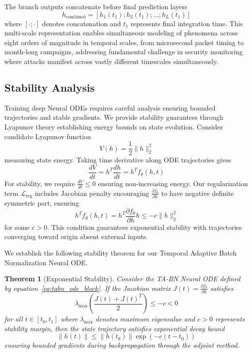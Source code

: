 \documentclass[10pt,journal,compsoc]{IEEEtran}
\newtheorem{theorem}{Theorem}
\begin{document}
The branch outputs concatenate before final prediction layers
\begin{equation}
h_{\text{combined}} = [h_1(t_1); h_2(t_1); \ldots; h_L(t_1)]
\end{equation}
where $[\cdot; \cdot]$ denotes concatenation and $t_1$ represents final integration time. This multi-scale representation enables simultaneous modeling of phenomena across eight orders of magnitude in temporal scales, from microsecond packet timing to month-long campaigns, addressing fundamental challenge in security monitoring where attacks manifest across vastly different timescales simultaneously.

\subsection{Stability Analysis}

Training deep Neural ODEs requires careful analysis ensuring bounded trajectories and stable gradients. We provide stability guarantees through Lyapunov theory establishing energy bounds on state evolution. Consider candidate Lyapunov function
\begin{equation}
V(h) = \frac{1}{2}\|h\|_2^2
\end{equation}
measuring state energy. Taking time derivative along ODE trajectories gives
\begin{equation}
\frac{dV}{dt} = h^T \frac{dh}{dt} = h^T f_\theta(h, t)
\end{equation}
For stability, we require $\frac{dV}{dt} \leq 0$ ensuring non-increasing energy. Our regularization term $\mathcal{L}_{\text{reg}}$ includes Jacobian penalty encouraging $\frac{\partial f_\theta}{\partial h}$ to have negative definite symmetric part, ensuring
\begin{equation}
h^T f_\theta(h, t) = h^T \frac{\partial f_\theta}{\partial h} h \leq -c\|h\|_2^2
\end{equation}
for some $c > 0$. This condition guarantees exponential stability with trajectories converging toward origin absent external inputs.

We establish the following stability theorem for our Temporal Adaptive Batch Normalization Neural ODE.

\begin{theorem}[Exponential Stability]
Consider the TA-BN Neural ODE defined by equation~\eqref{eq:tabn_ode_block}. If the Jacobian matrix $J(t) = \frac{\partial f_\theta}{\partial h}$ satisfies
\begin{equation}
\lambda_{\max}\left(\frac{J(t) + J(t)^T}{2}\right) \leq -c < 0
\end{equation}
for all $t \in [t_0, t_1]$ where $\lambda_{\max}$ denotes maximum eigenvalue and $c > 0$ represents stability margin, then the state trajectory satisfies exponential decay bound
\begin{equation}
\|h(t)\| \leq \|h(t_0)\| \exp(-c(t - t_0))
\end{equation}
ensuring bounded gradients during backpropagation through the adjoint method.
\end{theorem}
\end{document}
